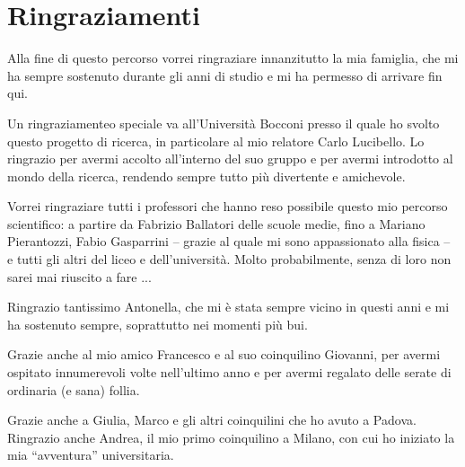 \chapter*{\swshape Ringraziamenti}
Alla fine di questo percorso vorrei ringraziare innanzitutto la mia famiglia, che mi ha sempre sostenuto durante gli anni di studio e mi ha permesso di arrivare fin qui.

Un ringraziamenteo speciale va all'Università Bocconi presso il quale ho svolto questo progetto di ricerca, in particolare al mio relatore Carlo Lucibello. Lo ringrazio per avermi accolto all'interno del suo gruppo e per avermi introdotto al mondo della ricerca, rendendo sempre tutto più divertente e amichevole.

Vorrei ringraziare tutti i professori che hanno reso possibile questo mio percorso scientifico: a partire da Fabrizio Ballatori delle scuole medie, fino a Mariano Pierantozzi, Fabio Gasparrini -- grazie al quale mi sono appassionato alla fisica -- e tutti gli altri del liceo e dell'università. Molto probabilmente, senza di loro non sarei mai riuscito a fare ...

Ringrazio tantissimo Antonella, che mi è stata sempre vicino in questi anni e mi ha sostenuto sempre, soprattutto nei momenti più bui.

Grazie anche al mio amico Francesco e al suo coinquilino Giovanni, per avermi ospitato innumerevoli volte nell'ultimo anno e per avermi regalato delle serate di ordinaria (e sana) follia.

Grazie anche a Giulia, Marco e gli altri coinquilini che ho avuto a Padova. Ringrazio anche Andrea, il mio primo coinquilino a Milano, con cui ho iniziato la mia ``avventura'' universitaria.




